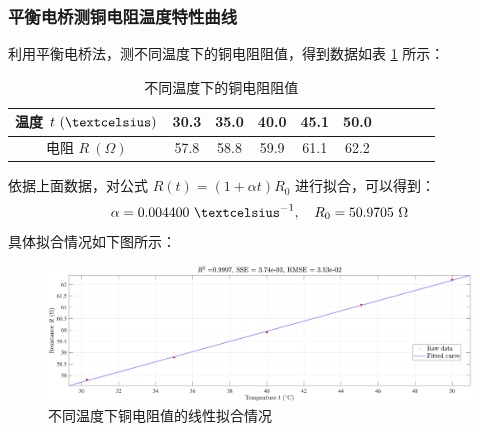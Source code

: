 \documentclass[UTF8]{article}
\theoremstyle{MyLineTheoremStyle} %
\theoremstyle{MyBlockTheoremStyle} %
\theoremstyle{MySubsubsectionStyle} %
\begin{document}
\subsubsection{平衡电桥测铜电阻温度特性曲线}
利用平衡电桥法，测不同温度下的铜电阻阻值，得到数据如表 \ref{不同温度下的铜电阻阻值} 所示：
\begin{table}[H]\centering
    \caption{不同温度下的铜电阻阻值}
    \label{不同温度下的铜电阻阻值}
\begin{tabular}{cccccccccc}\toprule
    温度 $t\ ( \textcelsius)$  & 30.3 &35.0 &40.0 &45.1 &50.0 \\
    \midrule
    电阻 $R \ (\Omega)$ &  57.8 &58.8 &59.9 &61.1 &62.2 \\
    \bottomrule
\end{tabular}
\end{table}
依据上面数据，对公式 $R(t) = (1 + \alpha t)R_0$ 进行拟合，可以得到：
\begin{equation}
\alpha = 0.004400 \ \textcelsius^{-1},\quad R_0 = 50.9705 \ \Omega
\end{equation}
具体拟合情况如下图所示：
\begin{figure}[H]\centering
    \includegraphics[width=\columnwidth]{assets/铜电阻.pdf}
    \caption{不同温度下铜电阻值的线性拟合情况}
\end{figure}
\end{document}
